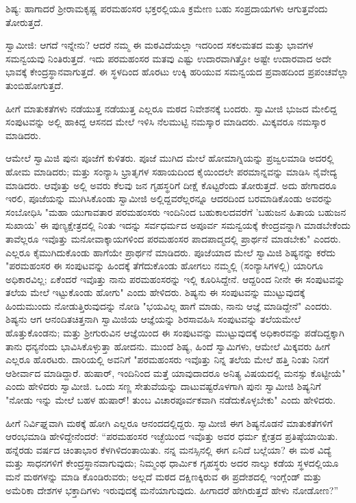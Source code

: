 ಶಿಷ್ಯ: ಹಾಗಾದರೆ ಶ‍್ರೀರಾಮಕೃಷ್ಣ ಪರಮಹಂಸರ ಭಕ್ತರಲ್ಲಿಯೂ ಕ್ರಮೇಣ ಬಹು ಸಂಪ್ರದಾಯಗಳು ಆಗುತ್ತವೆಂದು ತೋರುತ್ತದೆ.

ಸ್ವಾಮೀಜಿ: ಆಗದೆ ಇನ್ನೇನು? ಆದರೆ ನಮ್ಮ ಈ ಮಠವಿದೆಯಲ್ಲಾ ಇದರಿಂದ ಸಕಲಮತದ ಮತ್ತು ಭಾವಗಳ ಸಮನ್ವಯವು ನಿಂತಿರುತ್ತದೆ. ಇದು ಪರಮಹಂಸರ ಮತವು ಎಷ್ಟು ಉದಾರವಾಗಿತ್ತೋ ಅಷ್ಟೇ ಉದಾರವಾದ ಅದೇ ಭಾವಕ್ಕೆ ಕೇಂದ್ರಸ್ಥಾನವಾಗುತ್ತದೆ. ಈ ಸ್ಥಳದಿಂದ ಹೊರಟು ಉಕ್ಕಿ ಹರಿಯುವ ಸಮನ್ವಯದ ಪ್ರವಾಹದಿಂದ ಪ್ರಪಂಚವೆಲ್ಲಾ ತುಂಬಿಹೋಗುತ್ತದೆ.

ಹೀಗೆ ಮಾತುಕತೆಗಳು ನಡೆಯುತ್ತ ನಡೆಯುತ್ತ ಎಲ್ಲರೂ ಮಠದ ನಿವೇಶನಕ್ಕೆ ಬಂದರು. ಸ್ವಾಮೀಜಿ ಭುಜದ ಮೇಲಿದ್ದ ಸಂಪುಟವನ್ನು ಅಲ್ಲಿ ಹಾಕಿದ್ದ ಆಸನದ ಮೇಲೆ ಇಳಿಸಿ ನೆಲಮುಟ್ಟಿ ನಮಸ್ಕಾರ ಮಾಡಿದರು. ಮಿಕ್ಕವರೂ ನಮಸ್ಕಾರ ಮಾಡಿದರು.

ಆಮೇಲೆ ಸ್ವಾಮಿಜಿ ಪುನಃ ಪೂಜೆಗೆ ಕುಳಿತರು. ಪೂಜೆ ಮುಗಿದ ಮೇಲೆ ಹೋಮಾಗ್ನಿಯನ್ನು ಪ್ರಜ್ವಲಮಾಡಿ ಅದರಲ್ಲಿ ಹೋಮ ಮಾಡಿದರು; ಮತ್ತು ಸಂನ್ಯಾಸಿ ಭ್ರಾತೃಗಳ ಸಹಾಯದಿಂದ ಕೈಯಿಂದಲೇ ಪರಮಾನ್ನವನ್ನು ಮಾಡಿಸಿ ನೈವೇದ್ಯ ಮಾಡಿದರು. ಆವೊತ್ತು ಅಲ್ಲಿ ಅವರು ಕೆಲವು ಜನ ಗೃಹಸ್ಥರಿಗೆ ದೀಕ್ಷೆ ಕೊಟ್ಟರೆಂದು ತೋರುತ್ತದೆ. ಅದು ಹೇಗಾದರೂ ಇರಲಿ, ಪೂಜೆಯನ್ನು ಮುಗಿಸಿಕೊಂಡು ಸ್ವಾಮೀಜಿ ಅಲ್ಲಿದ್ದವರೆಲ್ಲರನ್ನೂ ಆದರದಿಂದ ಬರಮಾಡಿಕೊಂಡು ಅವರನ್ನು ಸಂಬೋಧಿಸಿ "ಮಹಾ ಯುಗಾವತಾರ ಪರಮಹಂಸರು ಇಂದಿನಿಂದ ಬಹುಕಾಲದವರೆಗೆ 'ಬಹುಜನ ಹಿತಾಯ ಬಹುಜನ ಸುಖಾಯ' ಈ ಪುಣ್ಯಕ್ಷೇತ್ರದಲ್ಲಿ ನಿಂತು ಇದನ್ನು ಸರ್ವಧರ್ಮದ ಅಪೂರ್ವ ಸಮನ್ವಯಕ್ಕೆ ಕೇಂದ್ರವನ್ನಾಗಿ ಮಾಡಬೇಕೆಂದು ತಾವೆಲ್ಲರೂ ಇವೊತ್ತು ಮನೋವಾಕ್ಕಾಯಗಳಿಂದ ಪರಮಹಂಸರ ಪಾದಪಾದ್ಮದಲ್ಲಿ ಪ್ರಾರ್ಥನೆ ಮಾಡಬೇಕು" ಎಂದರು. ಎಲ್ಲರೂ ಕೈಮುಗಿದುಕೊಂಡು ಹಾಗೆಯೇ ಪ್ರಾರ್ಥನೆ ಮಾಡಿದರು. ಪೂಜೆಯಾದ ಮೇಲೆ ಸ್ವಾಮಿಜಿ ಶಿಷ್ಯನನ್ನು ಕರೆದು "ಪರಮಹಂಸರ ಈ ಸಂಪುಟವನ್ನು ಹಿಂದಕ್ಕೆ ತೆಗೆದುಕೊಂಡು ಹೋಗಲು ನಮ್ಮಲ್ಲಿ (ಸಂನ್ಯಾಸಿಗಳಲ್ಲಿ) ಯಾರಿಗೂ ಅಧಿಕಾರವಿಲ್ಲ; ಏಕೆಂದರೆ ಇವೊತ್ತು ನಾನು ಪರಮಹಂಸರನ್ನು ಇಲ್ಲಿ ಕೂರಿಸಿದ್ದೇನೆ. ಆದ್ದರಿಂದ ನೀನೇ ಈ ಸಂಪುಟವನ್ನು ತಲೆಯ ಮೇಲೆ ಇಟ್ಟುಕೊಂಡು ಹೋಗು" ಎಂದು ಹೇಳಿದರು. ಶಿಷ್ಯನು ಈ ಸಂಪುಟವನ್ನು ಮುಟ್ಟುವುದಕ್ಕೆ ಹಿಂದುಮುಂದು ನೋಡುತ್ತಿರುವುದನ್ನು ನೋಡಿ "ಭಯವಿಲ್ಲ ಹಾಗೆ ಮಾಡು, ನಾನು ಆಜ್ಞೆ ಮಾಡಿದ್ದೇನೆ" ಎಂದರು. ಶಿಷ್ಯನು ಆಗ ಆನಂದಿತಚಿತ್ತನಾಗಿ ಸ್ವಾಮಿಜಿಯ ಆಜ್ಞೆಯನ್ನು ಶಿರಸಾವಹಿಸಿ ಸಂಪುಟವನ್ನು ತಲೆಯಮೇಲೆ ಹೊತ್ತುಕೊಂಡನು; ಮತ್ತು ಶ‍್ರೀಗುರುವಿನ ಆಜ್ಞೆಯಿಂದ ಈ ಸಂಪುಟವನ್ನು ಮುಟ್ಟುವುದಕ್ಕೆ ಅಧಿಕಾರವನ್ನು ಪಡೆದಿದ್ದಕ್ಕಾಗಿ ತಾನು ಧನ್ಯನೆಂದು ಭಾವಿಸಿಕೊಳ್ಳುತ್ತಾ ಹೋದನು. ಮುಂದೆ ಶಿಷ್ಯ, ಹಿಂದೆ ಸ್ವಾಮಿಗಳು, ಆಮೇಲೆ ಮಿಕ್ಕವರು ಹೀಗೆ ಎಲ್ಲರೂ ಹೊರಟರು. ದಾರಿಯಲ್ಲಿ ಅವನಿಗೆ "ಪರಮಹಂಸರು ಇವೊತ್ತು ನಿನ್ನ ತಲೆಯ ಮೇಲೆ ಹತ್ತಿ ನಿಂತು ನಿನಗೆ ಆಶೀರ್ವಾದ ಮಾಡಿದ್ದಾರೆ. ಹುಷಾರ್, ಇಂದಿನಿಂದ ಮತ್ತೆ ಯಾವುದಾದರೂ ಅನಿತ್ಯ ವಿಷಯದಲ್ಲಿ ಮನಸ್ಸು ಕೊಟ್ಟೀಯೆ" ಎಂದು ಹೇಳಿದರು ಸ್ವಾಮೀಜಿ. ಒಂದು ಸಣ್ಣ ಸೇತುವೆಯನ್ನು ದಾಟುವಷ್ಟರೊಳಗಾಗಿ ಪುನಃ ಸ್ವಾಮೀಜಿ ಶಿಷ್ಯನಿಗೆ "ನೋಡು ಇನ್ನು ಮೇಲೆ ಬಹಳ ಹುಷಾರ್! ತುಂಬ ವಿಚಾರಪೂರ್ವಕವಾಗಿ ನಡೆದುಕೊಳ್ಳಬೇಕು" ಎಂದು ಹೇಳಿದರು.

ಹೀಗೆ ನಿರ್ವಿಘ್ನವಾಗಿ ಮಠಕ್ಕೆ ಹೋಗಿ ಎಲ್ಲರೂ ಆನಂದದಲ್ಲಿದ್ದರು. ಸ್ವಾಮೀಜಿ ಈಗ ಶಿಷ್ಯನೊಡನೆ ಮಾತುಕತೆಗಳಿಗೆ ಆರಂಭಮಾಡಿ ಹೇಳಿದ್ದೇನೆಂದರೆ: “ಪರಮಹಂಸರ ಇಚ್ಛೆಯಿಂದ ಇವೊತ್ತು ಅವರ ಧರ್ಮ ಕ್ಷೇತ್ರದ ಪ್ರತಿಷ್ಠೆಯಾಯಿತು. ಹನ್ನೆರಡು ವರ್ಷದ ಚಿಂತಾಭಾರ ಕೆಳಗಿಳಿದಂತಾಯಿತು. ನನ್ನ ಮನಸ್ಸಿನಲ್ಲಿ ಈಗ ಏನಿದೆ ಬಲ್ಲೆಯಾ? ಈ ಮಠ ವಿದ್ಯೆ ಮತ್ತು ಸಾಧನಗಳಿಗೆ ಕೇಂದ್ರಸ್ಥಾನವಾಗುವುದು; ನಿಮ್ಮಂಥ ಧಾರ್ಮಿಕ ಗೃಹಸ್ಥರು ಅದರ ನಾಲ್ಕು ಕಡೆಯ ಸ್ಥಳದಲ್ಲಿಯೂ ಮನೆ ಮಠಗಳನ್ನು ಮಾಡಿ ಕೊಂಡಿರುವರು; ಅಲ್ಲದೆ ಮಠದ ದಕ್ಷಿಣಕ್ಕಿರುವ ಈ ಪ್ರದೇಶದಲ್ಲಿ ಇಂಗ್ಲೆಂಡ್ ಮತ್ತು ಅಮೆರಿಕಾ ದೇಶಗಳ ಭಕ್ತಾದಿಗಳು ಇರುವುದಕ್ಕೆ ಮನೆಯಾಗುವುದು. ಹೀಗಾದರೆ ಹೇಗಿರುತ್ತದೆ ಹೇಳು ನೋಡೋಣ?”

